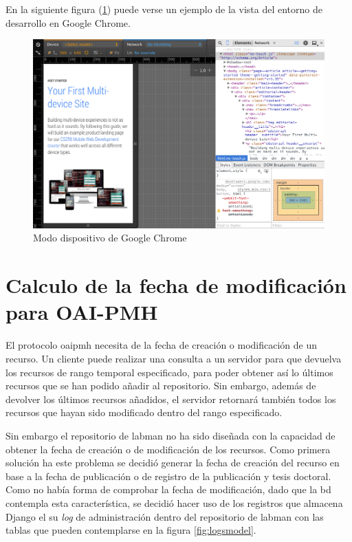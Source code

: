 En la siguiente figura (\ref{fig:google_device}) puede verse un ejemplo de la vista del entorno de desarrollo en Google Chrome.

\begin{figure}[!htp]
	 \centering
	 \includegraphics[scale=0.44]{fig/device_mode}
	 \caption{Modo dispositivo de Google Chrome}
	 \label{fig:google_device}
\end{figure}

\section{Calculo de la fecha de modificación para OAI-PMH}

El protocolo \acrshort{oaipmh} necesita de la fecha de creación o modificación de un recurso. Un cliente puede realizar una consulta a un servidor para que devuelva los recursos de rango temporal especificado, para poder obtener así lo últimos recursos que se han podido añadir al repositorio. Sin embargo, además de devolver los últimos recursos añadidos, el servidor retornará también todos los recursos que hayan sido modificado dentro del rango especificado.

Sin embargo el repositorio de \acrshort{labman} no ha sido diseñada con la capacidad de obtener la fecha de creación o de modificación de los recursos. Como primera solución ha este problema se decidió generar la fecha de creación del recurso en base a la fecha de publicación o de registro de la publicación y tesis doctoral. Como no había forma de comprobar la fecha de modificación, dado que la \acrshort{bd} contempla esta característica, se decidió hacer uso de los registros que almacena Django el su \textit{log} de administración dentro del repositorio de \acrshort{labman} con las tablas que pueden contemplarse en la figura \ref{fig:logsmodel}.

